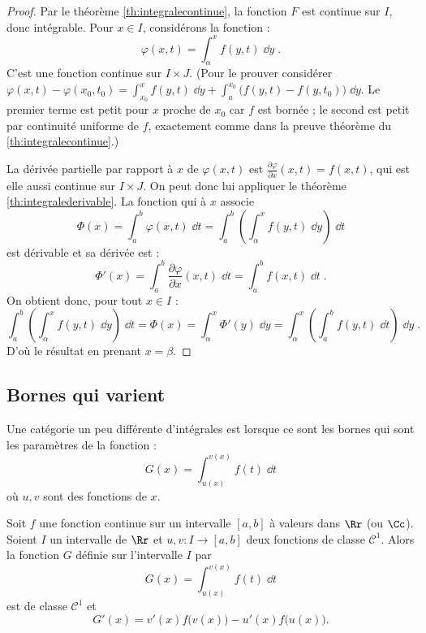 \documentclass[class=report,crop=false]{standalone}
\begin{document}
\begin{proof}
Par le théorème \ref{th:integralecontinue}, la fonction $F$ est continue sur $I$, donc intégrable.
Pour $x\in I$, considérons la fonction :
$$\varphi(x,t)= \int_{\alpha}^x f(y,t)\;\dd y\;.$$
C'est une fonction continue sur $I\times J$.
(Pour le prouver considérer 
$\varphi(x,t) - \varphi(x_0,t_0) =
\int_{x_0}^x f(y,t)\;\dd y + \int_a^{x_0} \big( f(y,t) - f(y,t_0) \big)\;\dd y$.
Le premier terme est petit pour $x$ proche de $x_0$ car $f$ est bornée ;
le second est petit par continuité uniforme de $f$, exactement comme dans 
la preuve théorème du \ref{th:integralecontinue}.)

La dérivée partielle par rapport à $x$ de $\varphi(x,t)$ est $\frac{\partial \varphi}{\partial x}(x,t) = f(x,t)$, qui est
elle aussi continue sur $I\times J$. 
On peut donc lui appliquer le théorème \ref{th:integralederivable}. 
La fonction qui à $x$ associe 
$$\Phi(x) = \int_a^b \varphi(x,t)\;\dd t=
\int_a^b\left(\int_{\alpha}^x f(y,t)\;\dd y\right)\;\dd t
$$
est dérivable et sa dérivée est :
$$\Phi'(x) = \int_a^b \frac{\partial \varphi}{\partial x}(x,t)\;\dd t = \int_a^bf(x,t)\;\dd t\;.$$
On obtient donc, pour tout $x\in I$ :
$$\int_a^b\left(\int_{\alpha}^x f(y,t)\;\dd y\right)\;\dd t
=\Phi(x)
= \int_\alpha^x \Phi'(y)\;\dd y
= \int_\alpha^x\left(\int_a^b f(y,t)\;\dd t\right)\;\dd y\;.$$
D'où le résultat en prenant $x=\beta$.
\end{proof}




\subsection{Bornes qui varient}

Une catégorie un peu différente d'intégrales est lorsque ce sont les bornes 
qui sont les paramètres de la fonction :
$$G(x) = \int_{u(x)}^{v(x)} f(t)\;\dd t$$
où $u,v$ sont des fonctions de $x$.


\begin{theoreme}
\label{th:intbornes}
Soit $f$ une fonction continue sur un intervalle $[a,b]$ à valeurs dans $\Rr$ (ou $\Cc$).
Soient $I$ un intervalle de $\Rr$ et $u,v : I \to [a,b]$ deux fonctions de classe 
$\mathcal{C}^1$. Alors la fonction $G$ définie sur l'intervalle $I$ par
$$G(x) = \int_{u(x)}^{v(x)} f(t)\;\dd t$$
est de classe $\mathcal{C}^1$ et
$$G'(x) = v'(x)f\big(v(x)\big )  - u'(x)f\big(u(x)\big ).$$
\end{theoreme}
\end{document}
